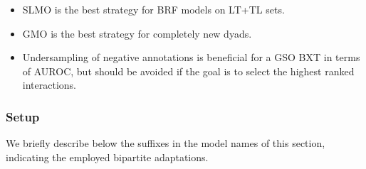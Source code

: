 \begin{mdframed}[frametitle={Key findings}]
    \begin{itemize}
        \item SLMO is the best strategy for BRF models on LT+TL sets.
        \item GMO is the best strategy for completely new dyads.
        \item Undersampling of negative annotations is beneficial for a GSO BXT in terms of AUROC, but should be avoided if the goal is to select the highest ranked interactions.
    \end{itemize}
\end{mdframed}

\subsubsection{Setup}

We briefly describe below the suffixes in the model names of this section, indicating the employed bipartite adaptations.


